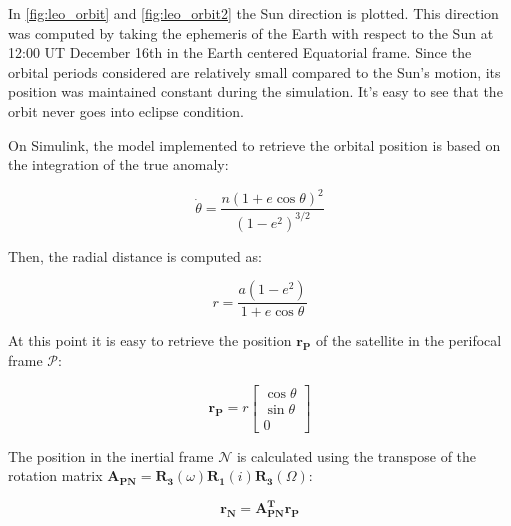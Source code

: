 
In \autoref{fig:leo_orbit} and \autoref{fig:leo_orbit2} the Sun direction is plotted. This direction was computed by taking the ephemeris of the Earth with respect to the Sun at 12:00 UT December 16th in the Earth centered Equatorial frame. Since the orbital periods considered are relatively small compared to the Sun's motion, its position was maintained constant during the simulation. It's easy to see that the orbit never goes into eclipse condition.

On Simulink, the model implemented to retrieve the orbital position is based on the integration of the true anomaly:

\begin{equation}
    \dot{\theta} = \frac{n \left( 1 + e \cos \theta \right)^2}{\left( 1 - e^2 \right)^{3/2}}
\end{equation}

Then, the radial distance is computed as:

\begin{equation}
    r = \frac{a \left( 1 - e^2 \right)}{1 + e \cos \theta}
\end{equation}

At this point it is easy to retrieve the position $\boldsymbol{r_P}$ of the satellite in the perifocal frame $\mathcal{P}$:

\begin{equation}
    \boldsymbol{r_P} = r
    \begin{bmatrix}
        \cos \theta \\
        \sin \theta \\
        0
    \end{bmatrix}
\end{equation}

The position in the inertial frame $\mathcal{N}$ is calculated using the transpose of the rotation matrix
$\boldsymbol{A_{PN}} = \boldsymbol{R_3} \left( \omega \right) \boldsymbol{R_1} \left( i \right) \boldsymbol{R_3}  \left( \Omega \right)$:

\begin{equation}
    \boldsymbol{r_N} = \boldsymbol{A_{PN}^T r_P}
\end{equation}